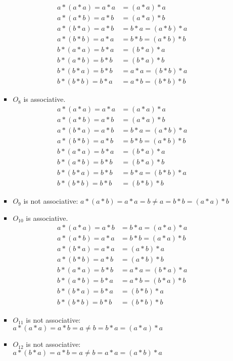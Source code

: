 \begin{enumerate}[label={\Alph*.},font={\bfseries}]
\begin{enumerate}[label={\arabic*},font={\bfseries}]
\begin{itemize}
      \begin{align*}
        a*(a*a) = a*a &= (a*a)*a \\
        a*(a*b) = a*b &= (a*a)*b \\
        a*(b*a) = a*b &= b*a = (a*b)*a \\
        a*(b*b) = a*a &= b*b = (a*b)*b \\
        b*(a*a) = b*a &= (b*a)*a \\
        b*(a*b) = b*b &= (b*a)*b \\
        b*(b*a) = b*b &= a*a = (b*b)*a \\
        b*(b*b) = b*a &= a*b = (b*b)*b
      \end{align*}
    \item $O_8$ is associative.
      \begin{align*}
        a*(a*a) = a*a &= (a*a)*a \\
        a*(a*b) = a*b &= (a*a)*b \\
        a*(b*a) = a*b &= b*a = (a*b)*a \\
        a*(b*b) = a*b &= b*b = (a*b)*b \\
        b*(a*a) = b*a &= (b*a)*a \\
        b*(a*b) = b*b &= (b*a)*b \\
        b*(b*a) = b*b &= b*a = (b*b)*a \\
        b*(b*b) = b*b &= (b*b)*b
      \end{align*}
    \item $O_9$ is not associative: $a*(a*b)=a*a=b \neq a=b*b=(a*a)*b$
    \item $O_{10}$ is associative.
      \begin{align*}
        a*(a*a) = a*b &= b*a = (a*a)*a \\
        a*(a*b) = a*a &= b*b = (a*a)*b \\
        a*(b*a) = a*a &= (a*b)*a \\
        a*(b*b) = a*b &= (a*b)*b \\
        b*(a*a) = b*b &= a*a = (b*a)*a \\
        b*(a*b) = b*a &= a*b = (b*a)*b \\
        b*(b*a) = b*a &= (b*b)*a \\
        b*(b*b) = b*b &= (b*b)*b
      \end{align*}
    \item $O_{11}$ is not associative: $a*(a*a)=a*b=a \neq b=b*a=(a*a)*a$
    \item $O_{12}$ is not associative: $a*(b*a)=a*b=a \neq b=a*a=(a*b)*a$

\end{itemize}
\end{enumerate}
\end{enumerate}
